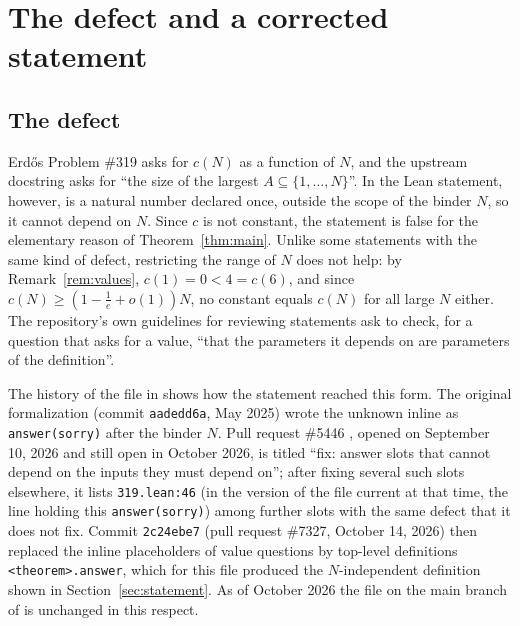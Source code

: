 \documentclass[11pt]{amsart}
\theoremstyle{plain}
\theoremstyle{definition}
\begin{document}
\section{The defect and a corrected statement}\label{sec:defect}

\subsection*{The defect}
Erd\H{o}s Problem \#319 asks for $c(N)$ as a function of $N$, and the upstream docstring asks for ``the size of the largest $A\subseteq\{1,\dots,N\}$''. In the Lean statement, however,  is a natural number declared once, outside the scope of the binder $N$, so it cannot depend on $N$. Since $c$ is not constant, the statement is false for the elementary reason of Theorem~\ref{thm:main}. Unlike some statements with the same kind of defect, restricting the range of $N$ does not help: by Remark~\ref{rem:values}, $c(1)=0<4=c(6)$, and since $c(N)\ge(1-\frac1e+o(1))N$, no constant equals $c(N)$ for all large $N$ either. The repository's own guidelines for reviewing statements ask to check, for a question that asks for a value, ``that the parameters it depends on are parameters of the definition''.

The history of the file in \cite{FC} shows how the statement reached this form. The original formalization (commit \texttt{aadedd6a}, May 2025) wrote the unknown inline as \texttt{answer(sorry)} after the binder $N$. Pull request \#5446 \cite{PR5446}, opened on September 10, 2026 and still open in October 2026, is titled ``fix: answer slots that cannot depend on the inputs they must depend on''; after fixing several such slots elsewhere, it lists \texttt{319.lean:46} (in the version of the file current at that time, the line holding this \texttt{answer(sorry)}) among further slots with the same defect that it does not fix. Commit \texttt{2c24ebe7} (pull request \#7327, October 14, 2026) then replaced the inline placeholders of value questions by top-level definitions \texttt{<theorem>.answer}, which for this file produced the $N$-independent definition shown in Section~\ref{sec:statement}. As of October 2026 the file on the main branch of \cite{FC} is unchanged in this respect.
\end{document}
